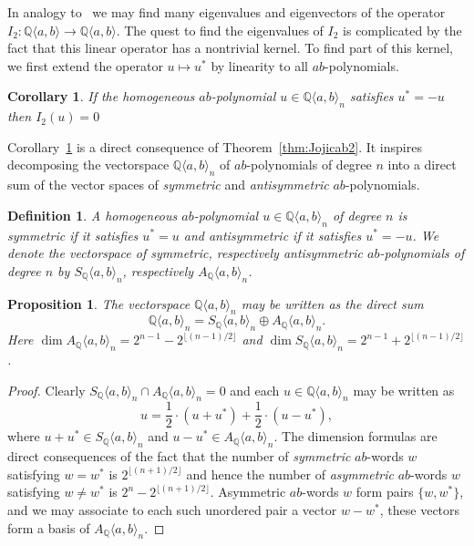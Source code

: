 \documentclass[reqno,12pt]{amsart}
\numberwithin{equation}{section}
\newtheorem{proposition}[theorem]{Proposition}
\newtheorem{definition}[theorem]{Definition}
\newtheorem{corollary}[theorem]{Corollary}
\newcommand{\0}{\widehat{0}}
\newcommand{\1}{\widehat{1}}
\newcommand{\2}{\widehat{2}}
\newcommand{\II}{I_2}
\newcommand{\Sym}[1]{S_{\mathbb Q}\langle a,b\rangle_{#1}}
\newcommand{\Asym}[1]{A_{\mathbb Q}\langle a,b\rangle_{#1}}
\begin{document}
In analogy to~\cite[Theorem 10.10]{Ehrenborg-Readdy-Tch} we may find
many eigenvalues and eigenvectors of the operator $\II: {\mathbb Q}\langle
a,b\rangle \rightarrow {\mathbb Q}\langle a,b\rangle$. The quest to find
the eigenvalues of $\II$ is complicated by the fact that this linear
operator has a nontrivial kernel. To find part of this kernel, we first extend
the operator $u\mapsto u^*$ by linearity to all $ab$-polynomials.  
\begin{corollary}
\label{cor:kernel}
If the homogeneous $ab$-polynomial $u\in {\mathbb Q}\langle
a,b\rangle_n$ satisfies $u^*=-u$ then $\II(u)=0$
\end{corollary}
Corollary~\ref{cor:kernel} is a direct consequence of
Theorem~\ref{thm:Jojicab2}. It inspires decomposing the vectorspace
${\mathbb Q}\langle a,b\rangle_n$ of $ab$-polynomials of degree $n$ into
a direct sum of the vector spaces of {\em symmetric} and {\em
  antisymmetric} $ab$-polynomials.
\begin{definition}
A homogeneous $ab$-polynomial $u\in{\mathbb Q}\langle a,b\rangle_n$ of
degree $n$ is {\em symmetric} if it satisfies $u^*=u$ and {\em
  antisymmetric} if it satisfies $u^*=-u$. We denote the vectorspace of
symmetric, respectively antisymmetric $ab$-polynomials of degree $n$ by
$\Sym{n}$, respectively $\Asym{n}$.  
\end{definition}  
\begin{proposition}
  The vectorspace ${\mathbb Q}\langle a,b\rangle_n$ may be written as
  the direct sum
  $$
{\mathbb Q}\langle a,b\rangle_n=\Sym{n}\oplus \Asym{n}.
$$
Here $\dim \Asym{n}=2^{n-1}-2^{\lfloor(n-1)/2\rfloor}$ and $\dim
\Sym{n}=2^{n-1}+2^{\lfloor(n-1)/2\rfloor}$.  
\end{proposition}
\begin{proof}
Clearly $\Sym{n}\cap \Asym{n}=0$ and each $u\in {\mathbb Q}\langle a,b\rangle_n$
may be written as
$$
u=\frac{1}{2}\cdot (u+u^*) +\frac{1}{2}\cdot (u-u^*),  
$$
where $u+u^*\in\Sym{n}$ and $u-u^*\in\Asym{n}$. The dimension
formulas are direct consequences of the fact that the number of {\em
  symmetric}  $ab$-words $w$ satisfying $w=w^*$ is $2^{\lfloor
  (n+1)/2\rfloor}$ and hence the number of {\em
  asymmetric}  $ab$-words $w$ satisfying $w\neq w^*$ is $2^n-2^{\lfloor
  (n+1)/2\rfloor}$. Asymmetric $ab$-words $w$ form pairs $\{w,w^*\}$,
and we may associate to each such unordered pair a vector $w-w^*$, these
vectors form a basis of $\Asym{n}$.
\end{proof}  
\end{document}
